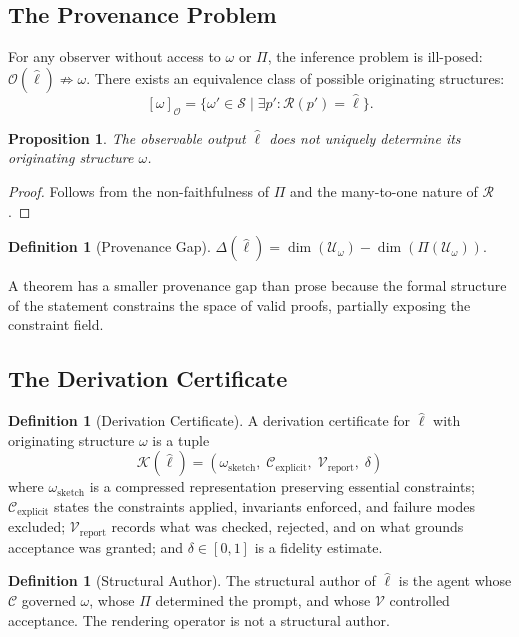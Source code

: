 \documentclass[12pt, a4paper]{article}
\theoremstyle{plain}
\newtheorem{proposition}[theorem]{Proposition}
\theoremstyle{definition}
\newtheorem{definition}[theorem]{Definition}
\theoremstyle{remark}
\begin{document}
\subsection{The Provenance Problem}

For any observer without access to $\omega$ or $\Pi$, the inference problem is ill-posed: $\mathcal{O}(\hat{\ell}) \not\Rightarrow \omega$. There exists an equivalence class of possible originating structures:
\[
[\omega]_{\mathcal{O}} = \{ \omega' \in \mathcal{S} \mid \exists p' : \mathcal{R}(p') = \hat{\ell} \}.
\]

\begin{proposition}
The observable output $\hat{\ell}$ does not uniquely determine its originating structure $\omega$.
\end{proposition}

\begin{proof}
Follows from the non-faithfulness of $\Pi$ and the many-to-one nature of $\mathcal{R}$.
\end{proof}

\begin{definition}[Provenance Gap]
$\Delta(\hat{\ell}) = \dim(\mathcal{U}_\omega) - \dim(\Pi(\mathcal{U}_\omega))$.
\end{definition}

A theorem has a smaller provenance gap than prose because the formal structure of the statement constrains the space of valid proofs, partially exposing the constraint field.

\subsection{The Derivation Certificate}

\begin{definition}[Derivation Certificate]
A derivation certificate for $\hat{\ell}$ with originating structure $\omega$ is a tuple
\[
\mathcal{K}(\hat{\ell}) = (\omega_{\mathrm{sketch}},\; \mathcal{C}_{\mathrm{explicit}},\; \mathcal{V}_{\mathrm{report}},\; \delta)
\]
where $\omega_{\mathrm{sketch}}$ is a compressed representation preserving essential constraints; $\mathcal{C}_{\mathrm{explicit}}$ states the constraints applied, invariants enforced, and failure modes excluded; $\mathcal{V}_{\mathrm{report}}$ records what was checked, rejected, and on what grounds acceptance was granted; and $\delta \in [0,1]$ is a fidelity estimate.
\end{definition}

\begin{definition}[Structural Author]
The structural author of $\hat{\ell}$ is the agent whose $\mathcal{C}$ governed $\omega$, whose $\Pi$ determined the prompt, and whose $\mathcal{V}$ controlled acceptance. The rendering operator is not a structural author.
\end{definition}
\end{document}
